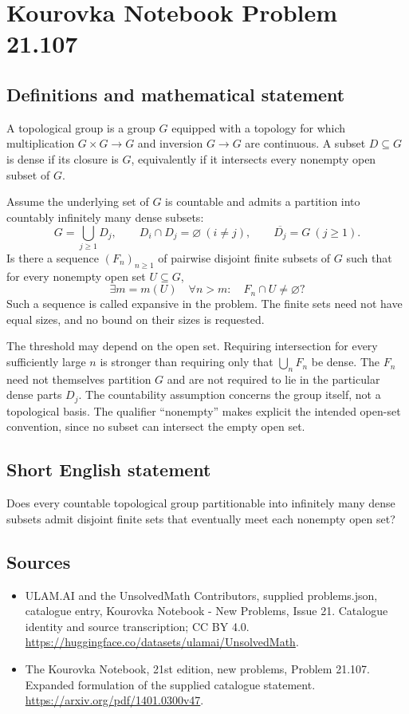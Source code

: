 \documentclass[11pt,a4paper]{article}
\begin{document}
\section*{Kourovka Notebook Problem 21.107}\label{statement}

\subsection{Definitions and mathematical statement}
A topological group is a group $G$ equipped with a topology for which multiplication $G\times G\to G$ and inversion $G\to G$ are continuous. A subset $D\subseteq G$ is dense if its closure is $G$, equivalently if it intersects every nonempty open subset of $G$.

Assume the underlying set of $G$ is countable and admits a partition into countably infinitely many dense subsets:
\[
 G=\bigcup_{j\ge1}D_j,\qquad D_i\cap D_j=\varnothing\ (i\ne j),
 \qquad\overline{D_j}=G\ (j\ge1).
\]
Is there a sequence $(F_n)_{n\ge1}$ of pairwise disjoint finite subsets of $G$ such that for every nonempty open set $U\subseteq G$,
\[
 \exists m=m(U)\quad\forall n>m:\quad F_n\cap U\ne\varnothing?
\]
Such a sequence is called expansive in the problem. The finite sets need not have equal sizes, and no bound on their sizes is requested.

The threshold may depend on the open set. Requiring intersection for every sufficiently large $n$ is stronger than requiring only that $\bigcup_nF_n$ be dense. The $F_n$ need not themselves partition $G$ and are not required to lie in the particular dense parts $D_j$. The countability assumption concerns the group itself, not a topological basis. The qualifier ``nonempty'' makes explicit the intended open-set convention, since no subset can intersect the empty open set.
\subsection{Short English statement}
Does every countable topological group partitionable into infinitely many dense subsets admit disjoint finite sets that eventually meet each nonempty open set?
\subsection{Sources}
\begin{itemize}
\item[S1] ULAM.AI and the UnsolvedMath Contributors, supplied problems.json, catalogue entry, Kourovka Notebook - New Problems, Issue 21. Catalogue identity and source transcription; CC BY 4.0.
\url{https://huggingface.co/datasets/ulamai/UnsolvedMath}.
\item[S2] The Kourovka Notebook, 21st edition, new problems, Problem 21.107. Expanded formulation of the supplied catalogue statement.
\url{https://arxiv.org/pdf/1401.0300v47}.
\end{itemize}
\end{document}
